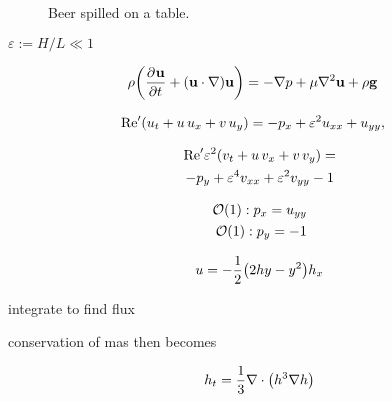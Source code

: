 \documentclass[11pt,a4paper,twocolumn]{article}
\title{}
\author{Brady Metherall}
\date{11 November 2019}
\let\originalleft\left
\let\originalright\right
\renewcommand{\left}{\mathopen{}\mathclose\bgroup\originalleft}
\renewcommand{\right}{\aftergroup\egroup\originalright}
\newcommand{\pdiff}[3][]{\frac{\partial^{#1}#2}{\partial{#3}^{#1}}}
\newcommand{\eps}{\varepsilon}
\providecommand{\bigO}[1]{\ensuremath{\mathop{}\mathopen{}\mathcal{O}\mathopen{}\left(#1\right)}}
\begin{document}
\maketitle

\begin{figure}[tbp]
\centering
{}
\caption{Beer spilled on a table.}
\label{fig}
\end{figure}

$\eps := H / L \ll 1$

\begin{align*}
\rho \left( \pdiff{\mathbf{u}}{t} + \left( \mathbf{u} \cdot \nabla \right) \mathbf{u} \right) &= - \nabla p + \mu \nabla^2 \mathbf{u} + \rho \mathbf{g}
\end{align*}

\begin{align}
\text{Re}' \left( u_t + u \, u_x + v \, u_y \right) &= - p_x + \eps^2 u_{xx} + u_{yy}, 
\end{align}

\begin{multline}
\text{Re}' \eps^2 \left( v_t + u \, v_x + v \, v_y \right) = \\
- p_y + \eps^4 v_{xx} + \eps^2 v_{yy} - 1
\end{multline}

\begin{align}
\bigO{1}: p_x = u_{yy} \\
\bigO{1}: p_y = -1
\end{align}

\begin{align}
u = -\frac{1}{2} \left( 2hy - y^2 \right) h_x
\end{align}

integrate to find flux

conservation of mas then becomes

\begin{align}
h_t = \frac{1}{3} \nabla \cdot \left( h^3 \nabla h \right)
\label{eq:height}
\end{align}
\end{document}
